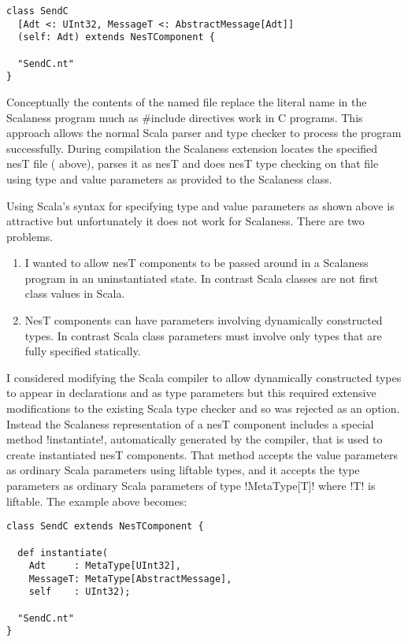 \singlespace
\vspace{1.0ex}
\begin{lstlisting}[language=scalaness]
class SendC
  [Adt <: UInt32, MessageT <: AbstractMessage[Adt]]
  (self: Adt) extends NesTComponent {

  "SendC.nt"
}
\end{lstlisting}
\vspace{1.0ex}
\primaryspacing

Conceptually the contents of the named file replace the literal name in the Scalaness program
much as \#include directives work in C programs. This approach allows the normal Scala parser
and type checker to process the program successfully. During compilation the Scalaness extension
locates the specified nesT file ( above), parses it as nesT and does nesT
type checking on that file using type and value parameters as provided to the Scalaness class.

Using Scala's syntax for specifying type and value parameters as shown above is attractive but
unfortunately it does not work for Scalaness. There are two problems.
\begin{enumerate}
\item I wanted to allow nesT components to be passed around in a Scalaness program in an
  uninstantiated state. In contrast Scala classes are not first class values in Scala.
\item NesT components can have parameters involving dynamically constructed types. In contrast
  Scala class parameters must involve only types that are fully specified statically.
\end{enumerate}

I considered modifying the Scala compiler to allow dynamically constructed types to appear in
declarations and as type parameters but this required extensive modifications to the existing
Scala type checker and so was rejected as an option. Instead the Scalaness representation of a
nesT component includes a special method !instantiate!, automatically generated by the compiler,
that is used to create instantiated nesT components. That method accepts the value parameters as
ordinary Scala parameters using liftable types, and it accepts the type parameters as ordinary
Scala parameters of type !MetaType[T]! where !T! is liftable. The example above becomes:

\singlespace
\vspace{1.0ex}
\begin{lstlisting}[language=scalaness]
class SendC extends NesTComponent {

  def instantiate(
    Adt     : MetaType[UInt32],
    MessageT: MetaType[AbstractMessage],
    self    : UInt32);

  "SendC.nt"
}
\end{lstlisting}
\vspace{1.0ex}
\primaryspacing

